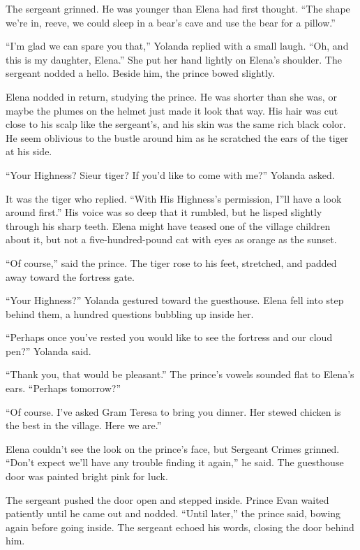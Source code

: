 \documentclass[10pt]{book}
\begin{document}
The sergeant grinned. He was younger than Elena had first thought. ``The shape we're in, reeve, we could sleep in a bear's cave and use the bear for a pillow.''

``I'm glad we can spare you that,'' Yolanda replied with a small laugh. ``Oh, and this is my daughter, Elena.'' She put her hand lightly on Elena's shoulder. The sergeant nodded a hello. Beside him, the prince bowed slightly.

Elena nodded in return, studying the prince. He was shorter than she was, or maybe the plumes on the helmet just made it look that way. His hair was cut close to his scalp like the sergeant's, and his skin was the same rich black color. He seem oblivious to the bustle around him as he scratched the ears of the tiger at his side.

``Your Highness? Sieur tiger? If you'd like to come with me?'' Yolanda asked.

It was the tiger who replied. ``With His Highness's permission, I''ll have a look around first.'' His voice was so deep that it rumbled, but he lisped slightly through his sharp teeth. Elena might have teased one of the village children about it, but not a five-hundred-pound cat with eyes as orange as the sunset.

``Of course,'' said the prince. The tiger rose to his feet, stretched, and padded away toward the fortress gate.

``Your Highness?'' Yolanda gestured toward the guesthouse. Elena fell into step behind them, a hundred questions bubbling up inside her.

``Perhaps once you've rested you would like to see the fortress and our cloud pen?'' Yolanda said.

``Thank you, that would be pleasant.'' The prince's vowels sounded flat to Elena's ears. ``Perhaps tomorrow?''

``Of course. I've asked Gram Teresa to bring you dinner. Her stewed chicken is the best in the village. Here we are.''

Elena couldn't see the look on the prince's face, but Sergeant Crimes grinned. ``Don't expect we'll have any trouble finding it again,'' he said. The guesthouse door was painted bright pink for luck.

The sergeant pushed the door open and stepped inside. Prince Evan waited patiently until he came out and nodded. ``Until later,'' the prince said, bowing again before going inside. The sergeant echoed his words, closing the door behind him.
\end{document}

